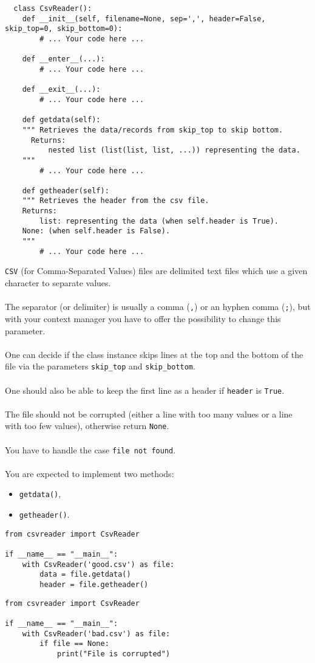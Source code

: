 \begin{verbatim}
  class CsvReader():
	def __init__(self, filename=None, sep=',', header=False, skip_top=0, skip_bottom=0):
		# ... Your code here ...

	def __enter__(...):
		# ... Your code here ...
	
	def __exit__(...):
		# ... Your code here ...
	
	def getdata(self):
	""" Retrieves the data/records from skip_top to skip bottom.
	  Returns:
		  nested list (list(list, list, ...)) representing the data.
	"""
		# ... Your code here ...

	def getheader(self):
	""" Retrieves the header from the csv file.
	Returns:
		list: representing the data (when self.header is True).
    None: (when self.header is False).
	"""
		# ... Your code here ...
\end{verbatim}
\newline
\texttt{CSV} (for Comma-Separated Values) files are delimited text files which use a given character to separate values.\\
\\
The separator (or delimiter) is usually a comma (\texttt{,}) or an hyphen comma (\texttt{;}), 
but with your context manager you have to offer the possibility to change this parameter.\\
\\
One can decide if the class instance skips lines at the top and the bottom of the file via the
parameters \texttt{skip\_top} and \texttt{skip\_bottom}.\\
\\
One should also be able to keep the first line as a header if \texttt{header} is \texttt{True}.\\
\\
The file should not be corrupted (either a line with too many values or a line
with too few values), otherwise return \texttt{None}.\\
\\
You have to handle the case \texttt{file not found}.\\
\\
You are expected to implement two methods:
\begin{itemize}
  \item \texttt{getdata()},
  \item \texttt{getheader()}.
\end{itemize}

\begin{verbatim}
from csvreader import CsvReader

if __name__ == "__main__":
	with CsvReader('good.csv') as file:
		data = file.getdata()
		header = file.getheader()
\end{verbatim}

\begin{verbatim}
from csvreader import CsvReader

if __name__ == "__main__":
	with CsvReader('bad.csv') as file:
		if file == None:
			print("File is corrupted")
\end{verbatim}